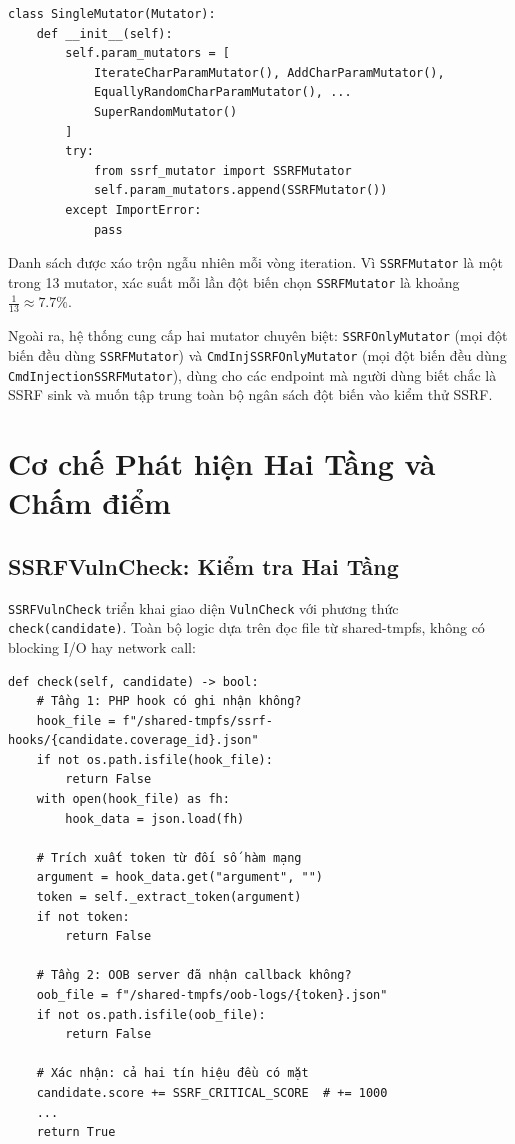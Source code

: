 \begin{verbatim}
class SingleMutator(Mutator):
    def __init__(self):
        self.param_mutators = [
            IterateCharParamMutator(), AddCharParamMutator(),
            EquallyRandomCharParamMutator(), ...
            SuperRandomMutator()
        ]
        try:
            from ssrf_mutator import SSRFMutator
            self.param_mutators.append(SSRFMutator())
        except ImportError:
            pass
\end{verbatim}

Danh sách được xáo trộn ngẫu nhiên mỗi vòng iteration. Vì
\texttt{SSRFMutator} là một trong 13 mutator, xác suất mỗi lần đột biến
chọn \texttt{SSRFMutator} là khoảng $\frac{1}{13} \approx 7.7\%$.

Ngoài ra, hệ thống cung cấp hai mutator chuyên biệt:
\texttt{SSRFOnlyMutator} (mọi đột biến đều dùng \texttt{SSRFMutator})
và \texttt{CmdInjSSRFOnlyMutator} (mọi đột biến đều dùng
\texttt{CmdInjectionSSRFMutator}), dùng cho các endpoint mà người dùng
biết chắc là SSRF sink và muốn tập trung toàn bộ ngân sách đột biến vào
kiểm thử SSRF.

\section{Cơ chế Phát hiện Hai Tầng và Chấm điểm}
\label{sec:feedback-impl}

\subsection{SSRFVulnCheck: Kiểm tra Hai Tầng}

\texttt{SSRFVulnCheck} triển khai giao diện \texttt{VulnCheck} với phương
thức \texttt{check(candidate)}. Toàn bộ logic dựa trên đọc file từ
shared-tmpfs, không có blocking I/O hay network call:

\begin{verbatim}
def check(self, candidate) -> bool:
    # Tầng 1: PHP hook có ghi nhận không?
    hook_file = f"/shared-tmpfs/ssrf-hooks/{candidate.coverage_id}.json"
    if not os.path.isfile(hook_file):
        return False
    with open(hook_file) as fh:
        hook_data = json.load(fh)

    # Trích xuất token từ đối số hàm mạng
    argument = hook_data.get("argument", "")
    token = self._extract_token(argument)
    if not token:
        return False

    # Tầng 2: OOB server đã nhận callback không?
    oob_file = f"/shared-tmpfs/oob-logs/{token}.json"
    if not os.path.isfile(oob_file):
        return False

    # Xác nhận: cả hai tín hiệu đều có mặt
    candidate.score += SSRF_CRITICAL_SCORE  # += 1000
    ...
    return True
\end{verbatim}

